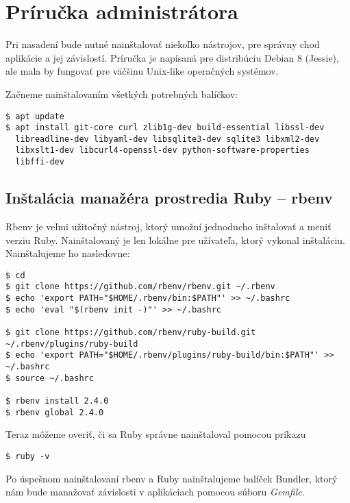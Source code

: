 \section*{Príručka administrátora}

Pri nasadení bude nutné nainštalovať niekoľko nástrojov, pre správny chod aplikácie a jej závislostí. Príručka je napísaná pre distribúciu Debian 8 (Jessie), ale mala by fungovať pre väčšinu Unix-like operačných systémov.

Začneme nainštalovaním všetkých potrebných balíčkov:

\begin{verbatim}
$ apt update
$ apt install git-core curl zlib1g-dev build-essential libssl-dev 
  libreadline-dev libyaml-dev libsqlite3-dev sqlite3 libxml2-dev 
  libxslt1-dev libcurl4-openssl-dev python-software-properties 
  libffi-dev

\end{verbatim}

\clearpage
\subsection*{Inštalácia manažéra prostredia Ruby -- rbenv}

Rbenv je veľmi užitočný nástroj, ktorý umožní jednoducho inštalovať a meniť verziu Ruby. Nainštalovaný je len lokálne pre užívateľa, ktorý vykonal inštaláciu. Nainštalujeme ho nasledovne:

\begin{verbatim}
$ cd
$ git clone https://github.com/rbenv/rbenv.git ~/.rbenv
$ echo 'export PATH="$HOME/.rbenv/bin:$PATH"' >> ~/.bashrc
$ echo 'eval "$(rbenv init -)"' >> ~/.bashrc

$ git clone https://github.com/rbenv/ruby-build.git ~/.rbenv/plugins/ruby-build
$ echo 'export PATH="$HOME/.rbenv/plugins/ruby-build/bin:$PATH"' >> ~/.bashrc
$ source ~/.bashrc

$ rbenv install 2.4.0
$ rbenv global 2.4.0
\end{verbatim}

Teraz môžeme overiť, či sa Ruby správne nainštaloval pomocou príkazu

\begin{verbatim}
$ ruby -v
\end{verbatim}

Po úspešnom nainštalovaní rbenv a Ruby nainštalujeme balíček Bundler, ktorý nám bude manažovať závislosti v aplikáciach pomocou súboru \emph{Gemfile}.

